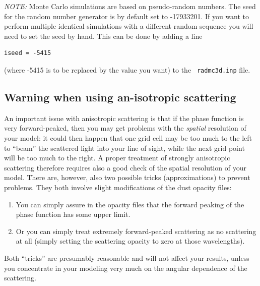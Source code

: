 \documentclass{report}
\begin{document}
{\em NOTE:} Monte Carlo simulations are based on pseudo-random numbers.
The seed for the random number generator is by default set to -17933201.
If you want to perform multiple identical simulations with a different
random sequence you will need to set the seed by hand. This can be
done by adding a line 
{\small\begin{verbatim}
iseed = -5415
\end{verbatim}}
(where -5415 is to be replaced by the value you want) to the {\small\tt
  radmc3d.inp} file.

\subsection{Warning when using an-isotropic scattering}
An important issue with anisotropic scattering is that if the phase function
is very forward-peaked, then you may get problems with the {\em spatial}
resolution of your model: it could then happen that one grid cell may be too
much to the left to ``beam'' the scattered light into your line of sight,
while the next grid point will be too much to the right. A proper treatment
of strongly anisotropic scattering therefore requires also a good check of
the spatial resolution of your model. There are, however, also two possible
tricks (approximations) to prevent problems. They both involve slight modifications of
the dust opacity files:
\begin{enumerate}
\item You can simply assure in the opacity files that the forward peaking of
  the phase function has some upper limit.
\item Or you can simply treat extremely forward-peaked scattering as no
  scattering at all (simply setting the scattering opacity to zero at those
  wavelengths). 
\end{enumerate}
Both ``tricks'' are presumably reasonable and will not affect your results,
unless you concentrate in your modeling very much on the angular dependence
of the scattering.
\end{document}
